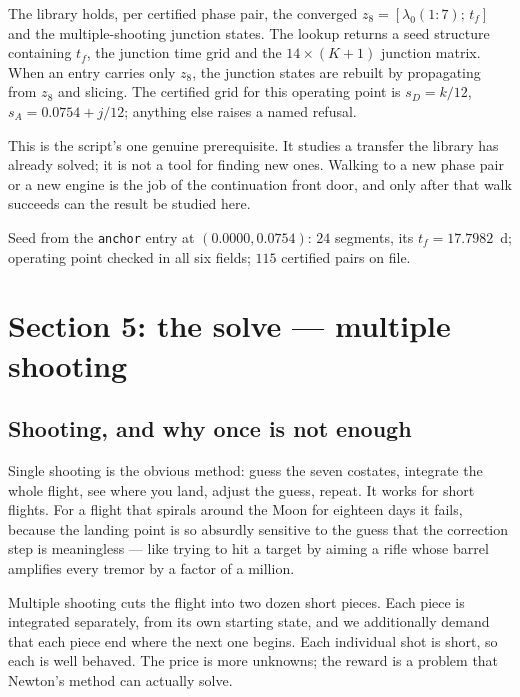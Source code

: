 \documentclass[11pt]{article}
\newcommand{\tf}{t_f}\newcommand{\R}{\mathbb{R}}
\newcommand{\code}[1]{\texttt{#1}}
\begin{document}
\begin{rig}
The library holds, per certified phase pair, the converged
$z_8 = [\lambda_0(1{:}7);\, \tf]$ and the multiple-shooting junction states.
The lookup returns a seed structure containing $\tf$, the junction time grid
and the $14 \times (K{+}1)$ junction matrix. When an entry carries only $z_8$,
the junction states are rebuilt by propagating from $z_8$ and slicing. The
certified grid for this operating point is $s_D = k/12$,
$s_A = 0.0754 + j/12$; anything else raises a named refusal.
\end{rig}

\begin{warn}
This is the script's one genuine prerequisite. It studies a transfer the
library has already solved; it is not a tool for finding new ones. Walking to a
new phase pair or a new engine is the job of the continuation front door, and
only after that walk succeeds can the result be studied here.
\end{warn}

\begin{ran}
Seed from the \code{anchor} entry at $(0.0000, 0.0754)$: $24$ segments, its
$\tf = 17.7982$~d; operating point checked in all six fields; $115$ certified
pairs on file.
\end{ran}

\section{Section 5: the solve --- multiple shooting}\label{sec:sec5}

\subsection{Shooting, and why once is not enough}

\begin{eli}
Single shooting is the obvious method: guess the seven costates, integrate the
whole flight, see where you land, adjust the guess, repeat. It works for short
flights. For a flight that spirals around the Moon for eighteen days it fails,
because the landing point is so absurdly sensitive to the guess that the
correction step is meaningless --- like trying to hit a target by aiming a rifle
whose barrel amplifies every tremor by a factor of a million.

Multiple shooting cuts the flight into two dozen short pieces. Each piece is
integrated separately, from its own starting state, and we additionally demand
that each piece end where the next one begins. Each individual shot is short, so
each is well behaved. The price is more unknowns; the reward is a problem that
Newton's method can actually solve.
\end{eli}
\end{document}
